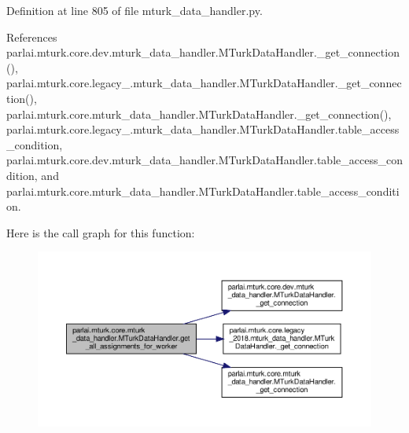 Definition at line 805 of file mturk\+\_\+data\+\_\+handler.\+py.



References parlai.\+mturk.\+core.\+dev.\+mturk\+\_\+data\+\_\+handler.\+M\+Turk\+Data\+Handler.\+\_\+get\+\_\+connection(), parlai.\+mturk.\+core.\+legacy\+\_.\+mturk\+\_\+data\+\_\+handler.\+M\+Turk\+Data\+Handler.\+\_\+get\+\_\+connection(), parlai.\+mturk.\+core.\+mturk\+\_\+data\+\_\+handler.\+M\+Turk\+Data\+Handler.\+\_\+get\+\_\+connection(), parlai.\+mturk.\+core.\+legacy\+\_.\+mturk\+\_\+data\+\_\+handler.\+M\+Turk\+Data\+Handler.\+table\+\_\+access\+\_\+condition, parlai.\+mturk.\+core.\+dev.\+mturk\+\_\+data\+\_\+handler.\+M\+Turk\+Data\+Handler.\+table\+\_\+access\+\_\+condition, and parlai.\+mturk.\+core.\+mturk\+\_\+data\+\_\+handler.\+M\+Turk\+Data\+Handler.\+table\+\_\+access\+\_\+condition.

Here is the call graph for this function\+:
\nopagebreak
\begin{figure}[H]
\begin{center}
\leavevmode
\includegraphics[width=350pt]{classparlai_1_1mturk_1_1core_1_1mturk__data__handler_1_1MTurkDataHandler_a13d0c1ca0cf41f7f7aca992c995da261_cgraph}
\end{center}
\end{figure}
\mbox{\label{classparlai_1_1mturk_1_1core_1_1mturk__data__handler_1_1MTurkDataHandler_af115126a912672f030143d16b281c1d3}} 
